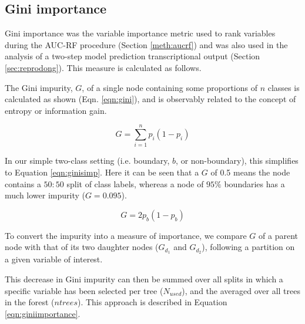 \documentclass[a4paper,11pt,oneside]{book}
\begin{document}
\subsection{Gini importance}\label{meth:gini}

Gini importance was the variable importance metric used to rank variables during the AUC-RF procedure (Section \ref{meth:aucrf}) and was also used in the analysis of a two-step model prediction transcriptional output (Section \ref{sec:reprodong}). This measure is calculated as follows.

The Gini impurity, $G$, of a single node containing some proportions of $n$ classes is calculated as shown (Eqn. \ref{eqn:gini}), and is observably related to the concept of entropy or information gain. 

\begin{equation}\label{eqn:gini}
G = \sum_{i=1}^{n} p_i(1-p_i)
\end{equation}

In our simple two-class setting (i.e. boundary, $b$, or non-boundary), this simplifies to Equation \ref{eqn:ginisimp}. Here it can be seen that a $G$ of 0.5 means the node contains a $50:50$ split of class labels, whereas a node of $95\%$ boundaries has a much lower impurity ($G = 0.095$).

\begin{equation}\label{eqn:ginisimp}
G =  2p_{b} (1-p_{b})
\end{equation}

To convert the impurity into a measure of importance, we compare $G$ of a parent node with that of its two daughter nodes ($G_{d_1}$ and $G_{d_2}$), following a partition on a given variable of interest. %

This decrease in Gini impurity can then be summed over all splits in which a specific variable has been selected per tree ($N_{used}$), and the averaged over all trees in the forest ($ntrees$). This approach is described in Equation \ref{eqn:giniimportance}.

\end{document}
